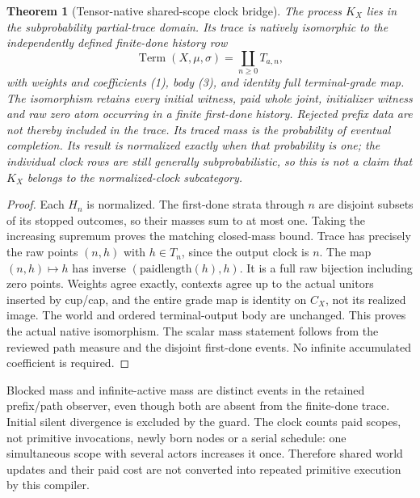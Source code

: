 \documentclass[11pt]{article}\usepackage{amsmath,amssymb,amsthm,geometry}\geometry{margin=1in}\newtheorem{definition}{Definition}\newtheorem{theorem}[definition]{Theorem}\newtheorem{proposition}[definition]{Proposition}
\begin{document}
\begin{theorem}[Tensor-native shared-scope clock bridge]
The process $K_X$ lies in the subprobability partial-trace domain. Its trace is natively isomorphic to the independently defined finite-done history row
\[
 \operatorname{Term}(X,\mu,\sigma)=\coprod_{n\geq0}T_{a,n},
\]
with weights and coefficients (1), body (3), and identity full terminal-grade map. The isomorphism retains every initial witness, paid whole joint, initializer witness and raw zero atom occurring in a finite first-done history. Rejected prefix data are not thereby included in the trace. Its traced mass is the probability of eventual completion. Its result is normalized exactly when that probability is one; the individual clock rows are still generally subprobabilistic, so this is not a claim that $K_X$ belongs to the normalized-clock subcategory.
\end{theorem}
\begin{proof}
Each $H_n$ is normalized. The first-done strata through $n$ are disjoint subsets of its stopped outcomes, so their masses sum to at most one. Taking the increasing supremum proves the matching closed-mass bound. Trace has precisely the raw points $(n,h)$ with $h\in T_n$, since the output clock is $n$. The map $(n,h)\mapsto h$ has inverse $(\mathrm{paidlength}(h),h)$. It is a full raw bijection including zero points. Weights agree exactly, contexts agree up to the actual unitors inserted by cup/cap, and the entire grade map is identity on $C_X$, not its realized image. The world and ordered terminal-output body are unchanged. This proves the actual native isomorphism. The scalar mass statement follows from the reviewed path measure and the disjoint first-done events. No infinite accumulated coefficient is required.
\end{proof}

Blocked mass and infinite-active mass are distinct events in the retained prefix/path observer, even though both are absent from the finite-done trace. Initial silent divergence is excluded by the guard. The clock counts paid scopes, not primitive invocations, newly born nodes or a serial schedule: one simultaneous scope with several actors increases it once. Therefore shared world updates and their paid cost are not converted into repeated primitive execution by this compiler.
\end{document}
